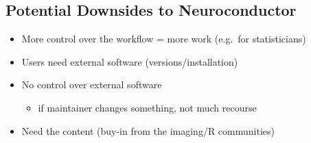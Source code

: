 \documentclass[final]{beamer}\usepackage[]{graphicx}\usepackage[]{color}
\begin{document}
\begin{frame}[fragile]
\begin{table}[!htb]
\begin{minipage}{0.36\linewidth}

\vspace*{-0.8cm}
\section{Potential Downsides to Neuroconductor}
\begin{itemize}
\item More control over the workflow = more work (e.g.~for statisticians)
\item Users need external software (versions/installation)
\item No control over external software
  \begin{itemize}
    \item if maintainer changes something, not much recourse
  \end{itemize}
\item Need the content (buy-in from the imaging/R communities)
\end{itemize}


\end{minipage}
\end{table}
\end{frame}
\end{document}
